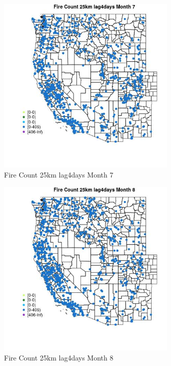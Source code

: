 \begin{figure} 
\centering  
\includegraphics[width=0.77\textwidth]{Code_Outputs/Report_ML_input_PM25_Step4_part_f_de_duplicated_aveswNAs_MapObsMo7Fire_Count_25km_lag4days.jpg} 
\caption{\label{fig:Report_ML_input_PM25_Step4_part_f_de_duplicated_aveswNAsMapObsMo7Fire_Count_25km_lag4days}Fire Count 25km lag4days Month 7} 
\end{figure} 
 

\begin{figure} 
\centering  
\includegraphics[width=0.77\textwidth]{Code_Outputs/Report_ML_input_PM25_Step4_part_f_de_duplicated_aveswNAs_MapObsMo8Fire_Count_25km_lag4days.jpg} 
\caption{\label{fig:Report_ML_input_PM25_Step4_part_f_de_duplicated_aveswNAsMapObsMo8Fire_Count_25km_lag4days}Fire Count 25km lag4days Month 8} 
\end{figure} 
 

